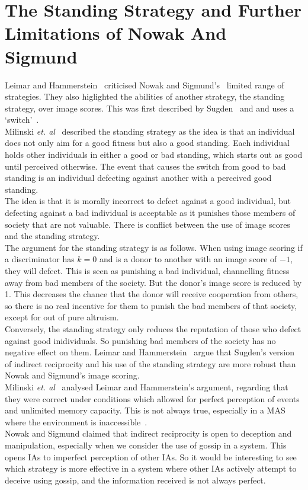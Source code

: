 \documentclass[]{final_report}
\begin{document}
\section{The Standing Strategy and Further Limitations of Nowak And Sigmund}
Leimar and Hammerstein~\cite{leimarhammer} criticised Nowak and Sigmund's~\cite{evol_indirect_image} limited range of strategies. They also higlighted the abilities of another strategy, the standing strategy, over image scores.  This was first described by Sugden~\cite{sugden2004economics} and and uses a `switch'~\cite{evol_indirect_image}.\\
Milinski \textit{et. al}~\cite{imagevsstanding} described the standing strategy as the idea is that an individual does not only aim for a good fitness but also a good standing. Each individual holds other individuals in either a good or bad standing, which starts out as good until perceived otherwise. The event that causes the switch from good to bad standing is an individual defecting against another with a perceived good standing.\\
The idea is that it is morally incorrect to defect against a good individual, but defecting against a bad individual is acceptable as it punishes those members of society that are not valuable. There is conflict between the use of image scores and the standing strategy.\\
The argument for the standing strategy is as follows. When using image scoring if a discriminator has $k=0$ and is a donor to another with an image score of $-1$, they will defect. This is seen as punishing a bad individual, channelling fitness away from bad members of the society. But the donor's image score is reduced by 1. This decreases the chance that the donor will receive cooperation from others, so there is no real incentive for them to punish the bad members of that society, except for out of pure altruism.\\
Conversely, the standing strategy only reduces the reputation of those who defect against good inidividuals. So punishing bad members of the society has no negative effect on them. Leimar and Hammerstein~\cite{leimarhammer} argue that Sugden's version of indirect reciprocity and his use of the standing strategy are more robust than Nowak and Sigmund's image scoring.\\
Milinski \textit{et. al}~\cite{imagevsstanding} analysed Leimar and Hammerstein's argument, regarding that they were correct under conditions which allowed for perfect perception of events and unlimited memory capacity. This is not always true, especially in a MAS where the environment is inaccessible~\cite{russell2016artificial}.\\
Nowak and Sigmund claimed that indirect reciprocity is open to deception and manipulation, especially when we consider the use of gossip in a system. This opens IAs to imperfect perception of other IAs. So it would be interesting to see which strategy is more effective in a system where other IAs actively attempt to deceive using gossip, and the information received is not always perfect.
\end{document}
